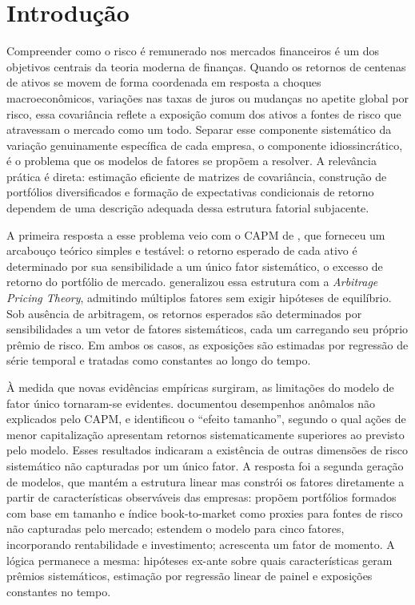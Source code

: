\chapter{Introdução}
\label{cap:introducao}

Compreender como o risco é remunerado nos mercados financeiros é um dos objetivos
centrais da teoria moderna de finanças. Quando os retornos de centenas de ativos se
movem de forma coordenada em resposta a choques macroeconômicos, variações nas taxas
de juros ou mudanças no apetite global por risco, essa covariância reflete a exposição
comum dos ativos a fontes de risco que atravessam o mercado como um todo. Separar esse
componente sistemático da variação genuinamente específica de cada empresa, o componente
idiossincrático, é o problema que os modelos de fatores se propõem a resolver. A
relevância prática é direta: estimação eficiente de matrizes de covariância, construção
de portfólios diversificados e formação de expectativas condicionais de retorno dependem
de uma descrição adequada dessa estrutura fatorial subjacente.

A primeira resposta a esse problema veio com o CAPM de \textcite{sharpe1964}, que
forneceu um arcabouço teórico simples e testável: o retorno esperado de cada ativo é
determinado por sua sensibilidade a um único fator sistemático, o excesso de retorno do
portfólio de mercado. \textcite{ross1976} generalizou essa estrutura com a
\textit{Arbitrage Pricing Theory}, admitindo múltiplos fatores sem exigir hipóteses de
equilíbrio. Sob ausência de arbitragem, os retornos esperados são determinados por
sensibilidades a um vetor de fatores sistemáticos, cada um carregando seu próprio prêmio
de risco. Em ambos os casos, as exposições são estimadas por regressão de série temporal
e tratadas como constantes ao longo do tempo.

À medida que novas evidências empíricas surgiram, as limitações do modelo de fator único
tornaram-se evidentes. \textcite{jensen1968} documentou desempenhos anômalos não
explicados pelo CAPM, e \textcite{banz1981} identificou o ``efeito tamanho'', segundo o
qual ações de menor capitalização apresentam retornos sistematicamente superiores ao
previsto pelo modelo. Esses resultados indicaram a existência de outras dimensões de
risco sistemático não capturadas por um único fator. A resposta foi a segunda geração de
modelos, que mantém a estrutura linear mas constrói os fatores diretamente a partir de
características observáveis das empresas: \textcite{fama1993} propõem portfólios formados
com base em tamanho e índice book-to-market como proxies para fontes de risco não
capturadas pelo mercado; \textcite{fama2015} estendem o modelo para cinco fatores,
incorporando rentabilidade e investimento; \textcite{carhart1997} acrescenta um fator de
momento. A lógica permanece a mesma: hipóteses ex-ante sobre quais características geram
prêmios sistemáticos, estimação por regressão linear de painel e exposições constantes no
tempo.

